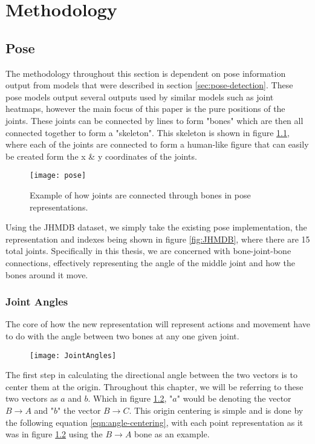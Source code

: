 
\chapter{Methodology}

\label{Methodology}

\section{Pose}

The methodology throughout this section is dependent on pose information output from models that were described in section \ref{sec:pose-detection}. These pose models output several outputs used by similar models such as joint heatmaps, however the main focus of this paper is the pure positions of the joints. These joints can be connected by lines to form "bones" which are then all connected together to form a "skeleton". This skeleton is shown in figure \ref{fig:pose}, where each of the joints are connected to form a human-like figure that can easily be created form the x \& y coordinates of the joints.

\begin{figure}[h]
	\texttt{[image: pose]}
	\centering
	\caption{Example of how joints are connected through bones in pose representations.}
	\label{fig:pose}
\end{figure}

Using the JHMDB dataset, we simply take the existing pose implementation, the representation and indexes being shown in figure \ref{fig:JHMDB}, where there are 15 total joints. Specifically in this thesis, we are concerned with bone-joint-bone connections, effectively representing the angle of the middle joint and how the bones around it move.

\subsection{Joint Angles}

The core of how the new representation will represent actions and movement have to do with the angle between two bones at any one given joint.

\begin{figure}[h]
	\texttt{[image: JointAngles]}
	\centering
	\caption{}
	\label{fig:joint-angles}
\end{figure}

The first step in calculating the directional angle between the two vectors is to center them at the origin. Throughout this chapter, we will be referring to these two vectors as $a$ and $b$. Which in figure \ref{fig:joint-angles}, "$a$" would be denoting the vector $B \rightarrow A$ and "$b$" the vector $B \rightarrow C$. This origin centering is simple and is done by the following equation \ref{eqn:angle-centering}, with each point representation as it was in figure \ref{fig:joint-angles} using the $B \rightarrow A$ bone as an example.

